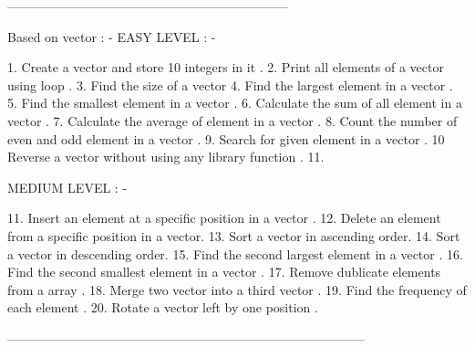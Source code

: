  ------------------------------------------------------------------

Based on vector : - 
EASY LEVEL : -

1. Create a vector and store 10 integers in it .
2. Print all elements of a vector using loop .
3. Find the size of a vector 
4. Find the largest element in a vector .
5. Find the smallest element in a vector .
6. Calculate the sum of all element in a vector .
7. Calculate the average of element in a vector .
8. Count the number of even and odd element in a vector .
9. Search for given element in a vector .
10 Reverse a vector without using any library function . 
11. 


MEDIUM LEVEL : -

11. Insert an element at a specific position in a vector .
12. Delete an element from a specific position in a vector.
13. Sort a vector in ascending order.
14. Sort a vector in descending order.
15. Find the second largest element in a vector .
16. Find the second smallest element in a vector .
17. Remove dublicate elements from a array .
18. Merge two vector into a third vector .
19. Find the frequency of each element .
20. Rotate a vector left by one position .

------------------------------------------------------------------------------------